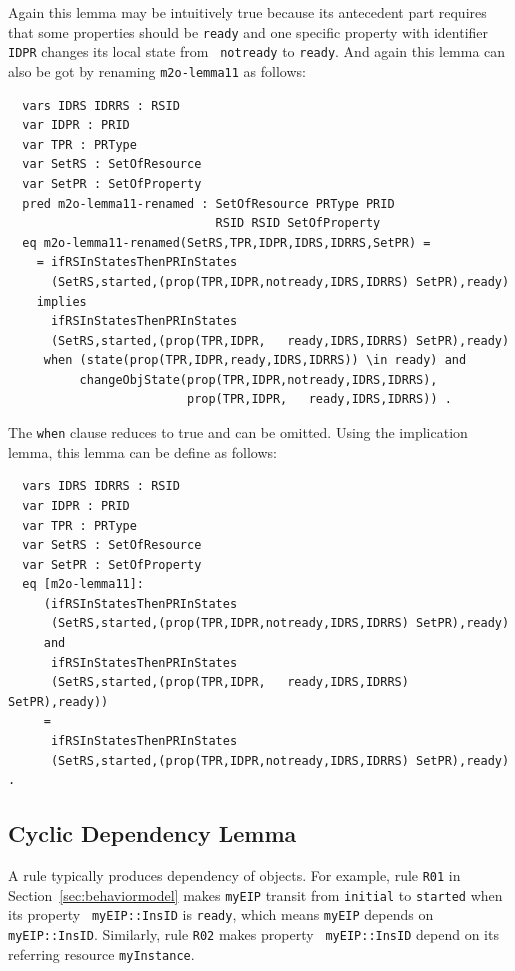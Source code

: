 \documentclass[12pt]{report}
\begin{document}
Again this lemma may be intuitively true because its antecedent part
requires that some properties should be {\tt ready} and one specific
property with identifier {\tt IDPR} changes its local state from {\tt
  notready} to {\tt ready}. And again this lemma can also be got by
renaming {\tt m2o-lemma11} as follows:
\begin{verbatim}
  vars IDRS IDRRS : RSID 
  var IDPR : PRID
  var TPR : PRType
  var SetRS : SetOfResource
  var SetPR : SetOfProperty
  pred m2o-lemma11-renamed : SetOfResource PRType PRID 
                             RSID RSID SetOfProperty
  eq m2o-lemma11-renamed(SetRS,TPR,IDPR,IDRS,IDRRS,SetPR) =
    = ifRSInStatesThenPRInStates
      (SetRS,started,(prop(TPR,IDPR,notready,IDRS,IDRRS) SetPR),ready)
    implies
      ifRSInStatesThenPRInStates
      (SetRS,started,(prop(TPR,IDPR,   ready,IDRS,IDRRS) SetPR),ready)
     when (state(prop(TPR,IDPR,ready,IDRS,IDRRS)) \in ready) and 
          changeObjState(prop(TPR,IDPR,notready,IDRS,IDRRS),
                         prop(TPR,IDPR,   ready,IDRS,IDRRS)) .
\end{verbatim}
The {\tt when} clause reduces to true and can be omitted. Using the
implication lemma, this lemma can be define as follows:
\begin{verbatim}
  vars IDRS IDRRS : RSID 
  var IDPR : PRID
  var TPR : PRType
  var SetRS : SetOfResource
  var SetPR : SetOfProperty
  eq [m2o-lemma11]:
     (ifRSInStatesThenPRInStates
      (SetRS,started,(prop(TPR,IDPR,notready,IDRS,IDRRS) SetPR),ready)
     and
      ifRSInStatesThenPRInStates
      (SetRS,started,(prop(TPR,IDPR,   ready,IDRS,IDRRS) SetPR),ready))
     = 
      ifRSInStatesThenPRInStates
      (SetRS,started,(prop(TPR,IDPR,notready,IDRS,IDRRS) SetPR),ready) .
\end{verbatim}

\subsection{Cyclic Dependency Lemma}
\label{sec:cyclelemma}
A rule typically produces dependency of objects.  For example, rule
{\tt R01} in Section~\ref{sec:behaviormodel} makes {\tt myEIP} transit
from {\tt initial} to {\tt started} when its property {\tt
  myEIP::InsID} is {\tt ready}, which means {\tt myEIP} depends on
{\tt myEIP::InsID}.  Similarly, rule {\tt R02} makes property {\tt
  myEIP::InsID} depend on its referring resource {\tt myInstance}.
\end{document}
